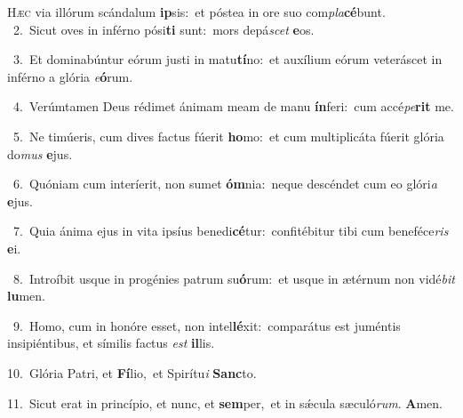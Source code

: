 \lettrine{\initial\textcolor{\initialcolor}{H}}{æc} via illórum scándalum \textbf{ip}\-sis:~\star et póstea in ore suo com\-\textit{pla}\-\textbf{cé}bunt.\\
{\numbfont\textcolor{\numbcolor}{~2.}}~Sicut oves in inférno pósi\textbf{ti} sunt:~\star mors depá\textit{scet} \textbf{e}\-os.\par
{\numbfont\textcolor{\numbcolor}{~3.}}~Et dominabúntur eórum justi in matu\-\textbf{tí}\-no:~\star et auxílium eórum veteráscet in inférno a glória \textit{e}\-\textbf{ó}rum.\par
{\numbfont\textcolor{\numbcolor}{~4.}}~Verúmtamen Deus rédimet ánimam meam de manu \textbf{ín}\-feri:~\star cum accé\-\textit{pe}\-\textbf{rit} me.\par
{\numbfont\textcolor{\numbcolor}{~5.}}~Ne timúeris, cum dives factus fúerit \textbf{ho}\-mo:~\star et cum multiplicáta fúerit glória do\textit{mus} \textbf{e}\-jus.\par
{\numbfont\textcolor{\numbcolor}{~6.}}~Quóniam cum interíerit, non sumet \textbf{óm}\-nia:~\star neque descéndet cum eo glóri\textit{a} \textbf{e}\-jus.\par
{\numbfont\textcolor{\numbcolor}{~7.}}~Quia ánima ejus in vita ipsíus benedi\-\textbf{cé}\-tur:~\star confitébitur tibi cum beneféce\textit{ris} \textbf{e}\-i.\par
{\numbfont\textcolor{\numbcolor}{~8.}}~Introíbit usque in progénies patrum su\-\textbf{ó}\-rum:~\star et usque in ætérnum non vidé\textit{bit} \textbf{lu}\-men.\par
{\numbfont\textcolor{\numbcolor}{~9.}}~Homo, cum in honóre esset, non intel\-\textbf{lé}\-xit:~\star comparátus est juméntis insipiéntibus, et símilis factus \textit{est} \textbf{il}\-lis.\par
{\numbfont\textcolor{\numbcolor}{10.}}~Glória Patri, et \textbf{Fí}\-lio,~\star et Spirítu\textit{i} \textbf{Sanc}\-to.\par
{\numbfont\textcolor{\numbcolor}{11.}}~Sicut erat in princípio, et nunc, et \textbf{sem}\-per,~\star et in sǽcula sæculó\-\textit{rum}\-. \textbf{A}\-men.\par
